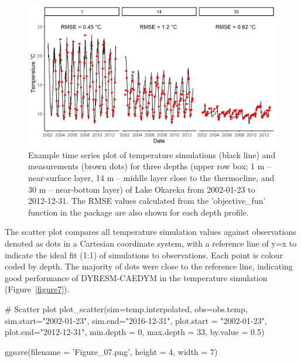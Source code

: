 \begin{figure}[htbp]
    \centering
    \includegraphics[scale=0.78]{Figure6.png}
    \caption{Example time series plot of temperature simulations (black line) and measurements (brown dots) for three depths (upper row box; 1 m – near-surface layer, 14 m – middle layer close to the thermocline, and 30 m – near-bottom layer) of Lake Okareka from 2002-01-23 to 2012-12-31. The RMSE values calculated from the 'objective\_fun' function in the package are also shown for each depth profile.}
    \label{figure6}
\end{figure}

The scatter plot compares all temperature simulation values against observations denoted as dots in a Cartesian coordinate system, with a reference line of y=x to indicate the ideal fit (1:1) of simulations to observations. Each point is colour coded by depth. The majority of dots were close to the reference line, indicating good performance of DYRESM-CAEDYM in the temperature simulation (Figure~\ref{figure7}).\par

\newpage

\begin{example}
    # Scatter plot
    plot_scatter(sim=temp.interpolated,
                 obs=obs.temp,
                 sim.start="2002-01-23",
                 sim.end="2016-12-31",
                 plot.start = "2002-01-23",
                 plot.end="2012-12-31",
                 min.depth = 0,
                 max.depth = 33,
                 by.value = 0.5)
                 
    ggsave(filename = 'Figure_07.png', height = 4, width = 7)
\end{example}

